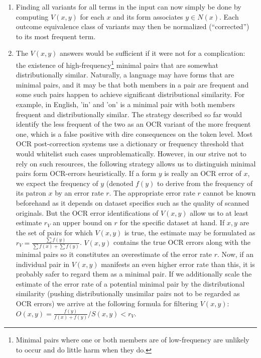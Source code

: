 \documentclass{sig-alternate}
\begin{document}
\begin{enumerate}
\item Finding all variants for all terms in the input can now simply
  be done by computing $V(x, y)$ for each $x$ and its form associates
  $y \in N(x)$.  Each outcome equivalence class of variants may then
  be normalized (``corrected'') to its most frequent term.

\item The $V(x, y)$ answers would be sufficient if it were not for a
  complication: the existence of high-frequency\footnote{Minimal pairs
    where one or both members are of low-frequency are unlikely to
    occur and do little harm when they do.} minimal pairs that are
  somewhat distributionally similar. Naturally, a language may have
  forms that are minimal pairs, and it may be that both members in a
  pair are frequent and some such pairs happen to achieve significant
  distributional similarity. For example, in English, 'in' and 'on' is
  a minimal pair with both members frequent and distributionally
  similar. The strategy described so far would identify the less
  frequent of the two as an OCR variant of the more frequent one,
  which is a false positive with dire consequences on the token
  level. Most OCR post-correction systems use a dictionary or
  frequency threshold that would whitelist such cases
  unproblematically.  However, in our strive not to rely on such
  resources, the following strategy allows us to distinguish minimal
  pairs form OCR-errors heuristically. If a form $y$ is really an OCR
  error of $x$, we expect the frequency of $y$ (denoted $f(y)$ to
  derive from the frequency of its patron $x$ by an error rate
  $r$. The appropriate error rate $r$ cannot be known beforehand as it
  depends on dataset specifics such as the quality of scanned
  originals. But the OCR error identifications of $V(x, y)$ allow us
  to at least estimate $r_V$ an upper bound on $r$ for the specific
  dataset at hand. If $x, y$ are the set of pairs for which $V(x, y)$
  is true, the estimate may be formulated as $r_V = \frac{\sum
    f(y)}{\sum f(x) + \sum f(y)}$. $V(x, y)$ contains the true OCR
  errors along with the minimal pairs so it constitutes an
  overestimate of the error rate $r$. Now, if an individual pair in
  $V(x, y)$ manifests an even higher error rate than this, it is
  probably safer to regard them as a minimal pair.  If we additionally
  scale the estimate of the error rate of a potential minimal pair by
  the distributional similarity (pushing distributionally unsimilar
  pairs not to be regarded as OCR errors) we arrive at the following
  formula for filtering $V(x, y)$: $O(x, y) = \frac{f(y)}{f(x) +
    f(y)}/S(x, y) < r_V$.
  \end{enumerate}
\end{document}

